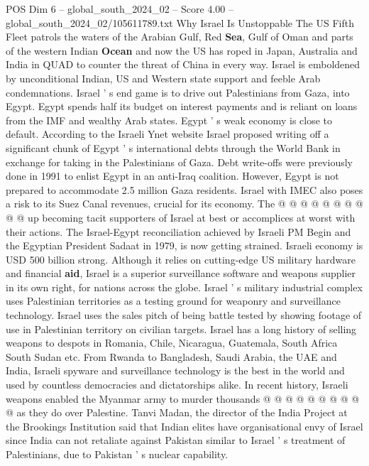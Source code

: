 \begin{textsample}{POS Dim 6 – global\_south\_2024\_02 – Score 4.00 – global\_south\_2024\_02/105611789.txt}  \label{ex:f6_pos_163}
Why Israel Is Unstoppable The US Fifth Fleet patrols the waters of the Arabian Gulf, Red \textbf{Sea}, Gulf of Oman and parts of the western Indian \textbf{Ocean} and now the US has roped in Japan, Australia and India in QUAD to counter the threat of China in every way.
Israel is emboldened by unconditional Indian, US and Western state support and feeble Arab condemnations.
Israel ' s end game is to drive out Palestinians from Gaza, into Egypt.
Egypt spends half its budget on interest payments and is reliant on loans from the IMF and wealthy Arab states.
Egypt ' s weak economy is close to default.
According to the Israeli Ynet website Israel proposed writing off a significant chunk of Egypt ' s international debts through the World Bank in exchange for taking in the Palestinians of Gaza.
Debt write-offs were previously done in 1991 to enlist Egypt in an anti-Iraq coalition.
However, Egypt is not prepared to accommodate 2.5 million Gaza residents.
Israel with IMEC also poses a risk to its Suez Canal revenues, crucial for its economy.
The @ @ @ @ @ @ @ @ @ @ up becoming tacit supporters of Israel at best or accomplices at worst with their actions.
The Israel-Egypt reconciliation achieved by Israeli PM Begin and the Egyptian President Sadaat in 1979, is now getting strained.
Israeli economy is USD 500 billion strong.
Although it relies on cutting-edge US military hardware and financial \textbf{aid}, Israel is a superior surveillance software and weapons supplier in its own right, for nations across the globe.
Israel ' s military industrial complex uses Palestinian territories as a testing ground for weaponry and surveillance technology.
Israel uses the sales pitch of being battle tested by showing footage of use in Palestinian territory on civilian targets.
Israel has a long history of selling weapons to despots in Romania, Chile, Nicaragua, Guatemala, South Africa South Sudan etc.
From Rwanda to Bangladesh, Saudi Arabia, the UAE and India, Israeli spyware and surveillance technology is the best in the world and used by countless democracies and dictatorships alike.
In recent history, Israeli weapons enabled the Myanmar army to murder thousands @ @ @ @ @ @ @ @ @ @ as they do over Palestine.
Tanvi Madan, the director of the India Project at the Brookings Institution said that Indian elites have organisational envy of Israel since India can not retaliate against Pakistan similar to Israel ' s treatment of Palestinians, due to Pakistan ' s nuclear capability.

\end{textsample}
